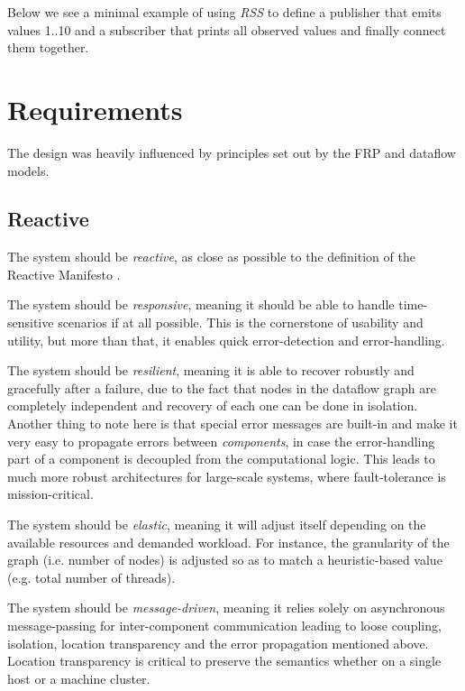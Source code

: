\documentclass[sigplan,review,anonymous]{acmart}\settopmatter{printfolios=true}
\begin{document}
Below we see a minimal example of using \textit{RSS} to define a publisher that emits values 1..10 and a subscriber that prints all observed values and finally connect them together.


\section{Requirements}

The design was heavily influenced by principles set out by the FRP and dataflow models. 

\subsection{Reactive}

The system should be \textit{reactive}, as close as possible to the definition of the Reactive Manifesto \cite{manifesto}. 

The system should be \textit{responsive}, meaning it should be able to handle time-sensitive scenarios if at all possible. This is the cornerstone of usability and utility, but more than that, it enables quick error-detection and error-handling.

The system should be \textit{resilient}, meaning it is able to recover robustly and gracefully after a failure, due to the fact that nodes in the dataflow graph are completely independent and recovery of each one can be done in isolation. Another thing to note here is that special error messages are built-in and make it very easy to propagate errors between \textit{components}, in case the error-handling part of a component is decoupled from the computational logic. This leads to much more robust architectures for large-scale systems, where fault-tolerance is mission-critical.

The system should be \textit{elastic}, meaning it will adjust itself depending on the available resources and demanded workload. For instance, the granularity of the graph (i.e. number of nodes) is adjusted so as to match a heuristic-based value (e.g. total number of threads).

The system should be \textit{message-driven}, meaning it relies solely on asynchronous message-passing for inter-component communication leading to loose coupling, isolation, location transparency and the error propagation mentioned above. Location transparency is critical to preserve the semantics whether on a single host or a machine cluster. 
\end{document}
